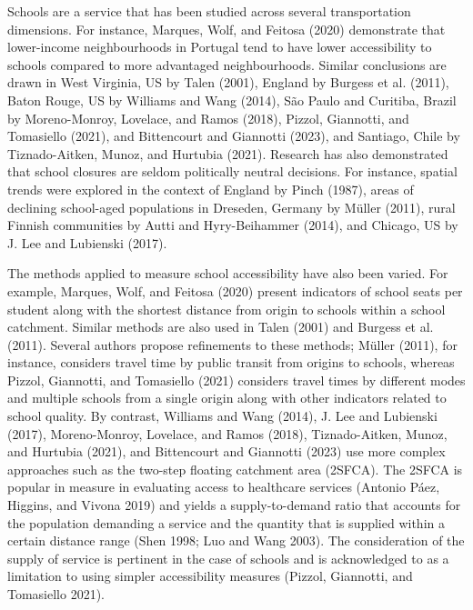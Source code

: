 \documentclass[
default
]{sn-jnl}
\begin{document}
Schools are a service that has been studied across several
transportation dimensions. For instance, Marques, Wolf, and Feitosa
(2020) demonstrate that lower-income neighbourhoods in Portugal tend to
have lower accessibility to schools compared to more advantaged
neighbourhoods. Similar conclusions are drawn in West Virginia, US by
Talen (2001), England by Burgess et al. (2011), Baton Rouge, US by
Williams and Wang (2014), São Paulo and Curitiba, Brazil by
Moreno-Monroy, Lovelace, and Ramos (2018), Pizzol, Giannotti, and
Tomasiello (2021), and Bittencourt and Giannotti (2023), and Santiago,
Chile by Tiznado-Aitken, Munoz, and Hurtubia (2021). Research has also
demonstrated that school closures are seldom politically neutral
decisions. For instance, spatial trends were explored in the context of
England by Pinch (1987), areas of declining school-aged populations in
Dreseden, Germany by Müller (2011), rural Finnish communities by Autti
and Hyry-Beihammer (2014), and Chicago, US by J. Lee and Lubienski
(2017).

The methods applied to measure school accessibility have also been
varied. For example, Marques, Wolf, and Feitosa (2020) present
indicators of school seats per student along with the shortest distance
from origin to schools within a school catchment. Similar methods are
also used in Talen (2001) and Burgess et al. (2011). Several authors
propose refinements to these methods; Müller (2011), for instance,
considers travel time by public transit from origins to schools, whereas
Pizzol, Giannotti, and Tomasiello (2021) considers travel times by
different modes and multiple schools from a single origin along with
other indicators related to school quality. By contrast, Williams and
Wang (2014), J. Lee and Lubienski (2017), Moreno-Monroy, Lovelace, and
Ramos (2018), Tiznado-Aitken, Munoz, and Hurtubia (2021), and
Bittencourt and Giannotti (2023) use more complex approaches such as the
two-step floating catchment area (2SFCA). The 2SFCA is popular in
measure in evaluating access to healthcare services (Antonio Páez,
Higgins, and Vivona 2019) and yields a supply-to-demand ratio that
accounts for the population demanding a service and the quantity that is
supplied within a certain distance range (Shen 1998; Luo and Wang 2003).
The consideration of the supply of service is pertinent in the case of
schools and is acknowledged to as a limitation to using simpler
accessibility measures (Pizzol, Giannotti, and Tomasiello 2021).
\end{document}
